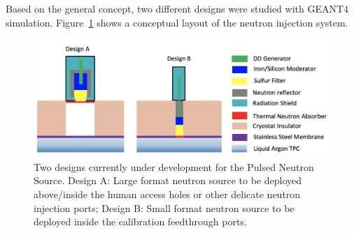 Based on the general concept, two different designs were studied with GEANT4 simulation. Figure~\ref{fig:PNS_source_design} shows a conceptual layout of the neutron injection system. %

\begin{figure}[tpb]
\centering
\includegraphics[width=16cm]{graphics/PNS_Two_Designs.png}
\caption{Two designs currently under development for the Pulsed Neutron Source. Design A: Large format neutron source to be deployed above/inside the human access holes or other delicate neutron injection ports; Design B: Small format neutron source to be deployed inside the calibration feedthrough ports.
}
\label{fig:PNS_source_design}
\end{figure}

